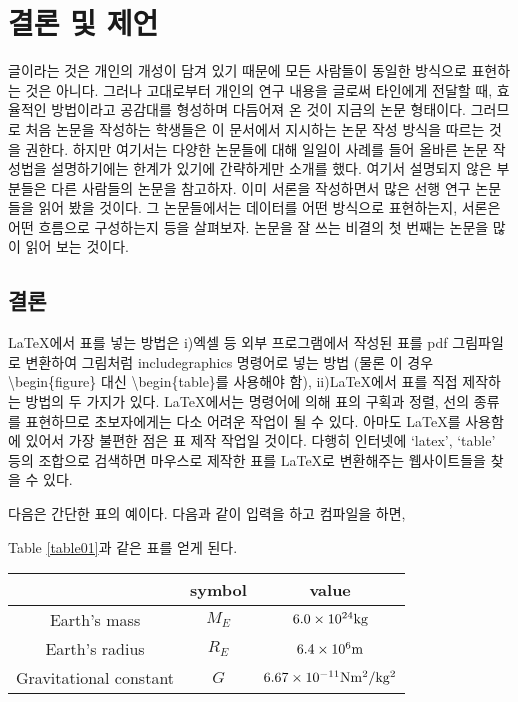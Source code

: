 \documentclass{gshs-report-v1.2}
\begin{document}
\section{결론 및 제언}
글이라는 것은 개인의 개성이 담겨 있기 때문에 모든 사람들이 동일한 방식으로 표현하는 것은 아니다. 그러나 고대로부터 개인의 연구 내용을 글로써 타인에게 전달할 때, 효율적인 방법이라고 공감대를 형성하며 다듬어져 온 것이 지금의 논문 형태이다. 그러므로 처음 논문을 작성하는 학생들은 이 문서에서 지시하는 논문 작성 방식을 따르는 것을 권한다. 하지만 여기서는 다양한 논문들에 대해 일일이 사례를 들어 올바른 논문 작성법을 설명하기에는 한계가 있기에 간략하게만 소개를 했다. 여기서 설명되지 않은 부분들은 다른 사람들의 논문을 참고하자. 이미 서론을 작성하면서 많은 선행 연구 논문들을 읽어 봤을 것이다. 그 논문들에서는 데이터를 어떤 방식으로 표현하는지, 서론은 어떤 흐름으로 구성하는지 등을 살펴보자. 논문을 잘 쓰는 비결의 첫 번째는 논문을 많이 읽어 보는 것이다.




\subsection{결론}

\LaTeX 에서 표를 넣는 방법은 i)엑셀 등 외부 프로그램에서 작성된 표를 pdf 그림파일로 변환하여 그림처럼 includegraphics 명령어로 넣는 방법 (물론 이 경우 {\textbackslash}begin\{figure\} 대신 {\textbackslash}begin\{table\}를 사용해야 함), ii)\LaTeX 에서 표를 직접 제작하는 방법의 두 가지가 있다. \LaTeX 에서는 명령어에 의해 표의 구획과 정렬, 선의 종류를 표현하므로 초보자에게는 다소 어려운 작업이 될 수 있다. 아마도 \LaTeX 를 사용함에 있어서 가장 불편한 점은 표 제작 작업일 것이다. 다행히 인터넷에 `latex', `table' 등의 조합으로 검색하면 마우스로 제작한 표를 \LaTeX 로 변환해주는 웹사이트들을 찾을 수 있다.

다음은 간단한 표의 예이다. 다음과 같이 입력을 하고 컴파일을 하면,

Table \ref{table01}과 같은 표를 얻게 된다.
\begin{table}[t]

	\begin{center}
		\begin{tabular}{c|c|c}
			\hline
			& symbol & value \\ \hline
			Earth's mass & $M_E$ & $6.0\times 10^{24} {\rm kg}$ \\
			Earth's radius & $R_E$ & $6.4\times 10^6 {\rm m}$ \\
			Gravitational constant & $G$ & $6.67\times 10^{-11} {\rm N m^2 /kg^2}$ \\ \hline
		\end{tabular}
	\end{center}
\end{table}
\end{document}

